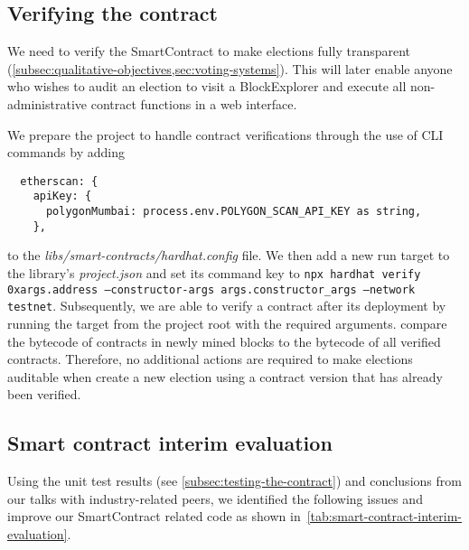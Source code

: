 \subsection{Verifying the contract}\label{subsec:verifying-the-contract}

We need to verify the \gls{SmartContract} to make elections fully transparent (\cref{subsec:qualitative-objectives,sec:voting-systems}).
This will later enable anyone who wishes to audit an election to visit a \gls{BlockExplorer} and execute all non-administrative contract functions in a web interface.

We prepare the project to handle contract verifications through the use of \gls{CLI} commands by adding

\begin{verbatim}
  etherscan: {
    apiKey: {
      polygonMumbai: process.env.POLYGON_SCAN_API_KEY as string,
    },
\end{verbatim}

to the \emph{libs/smart-contracts/hardhat.config} file.
We then add a new run target to the library's \emph{project.json} and set its command key to \texttt{npx hardhat verify 0x{args.address} --constructor-args {args.constructor_args} --network testnet}.
Subsequently, we are able to verify a contract after its deployment by running the target from the project root with the required arguments.
 compare the bytecode of contracts in newly mined blocks to the bytecode of all verified contracts.
Therefore, no additional actions are required to make elections auditable when  create a new election using a contract version that has already been verified.

\subsection{Smart contract interim evaluation}\label{subsec:smart-contract-interim-evaluation}

Using the unit test results (see \cref{subsec:testing-the-contract}) and conclusions from our talks with industry-related peers, we identified the following issues and improve our \gls{SmartContract} related code as shown in~\cref{tab:smart-contract-interim-evaluation}.

